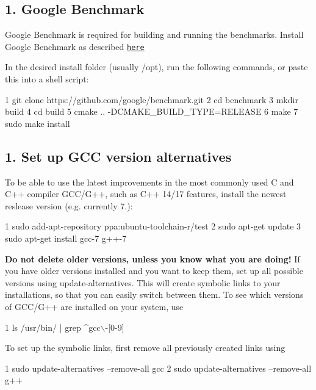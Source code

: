 \subsection*{1. Google Benchmark}

Google Benchmark is required for building and running the benchmarks. Install Google Benchmark as described \href{https://github.com/google/benchmark}{\tt here}

In the desired install folder (usually /opt), run the following commands, or paste this into a shell script\+:


\begin{DoxyCode}
1 git clone https://github.com/google/benchmark.git
2 cd benchmark
3 mkdir build
4 cd build
5 cmake .. -DCMAKE\_BUILD\_TYPE=RELEASE
6 make
7 sudo make install
\end{DoxyCode}


\subsection*{1. Set up G\+CC version alternatives}

To be able to use the latest improvements in the most commonly used C and C++ compiler G\+C\+C/\+G++, such as C++ 14/17 features, install the newest reslease version (e.\+g. currently 7.)\+:


\begin{DoxyCode}
1 sudo add-apt-repository ppa:ubuntu-toolchain-r/test
2 sudo apt-get update
3 sudo apt-get install gcc-7 g++-7
\end{DoxyCode}


{\bfseries Do not delete older versions, unless you know what you are doing!} If you have older versions installed and you want to keep them, set up all possible versions using update-\/alternatives. This will create symbolic links to your installations, so that you can easily switch between them. To see which versions of G\+C\+C/\+G++ are installed on your system, use


\begin{DoxyCode}
1 ls /usr/bin/ | grep ^gcc\(\backslash\)-[0-9]
\end{DoxyCode}


To set up the symbolic links, first remove all previously created links using


\begin{DoxyCode}
1 sudo update-alternatives --remove-all gcc
2 sudo update-alternatives --remove-all g++
\end{DoxyCode}


